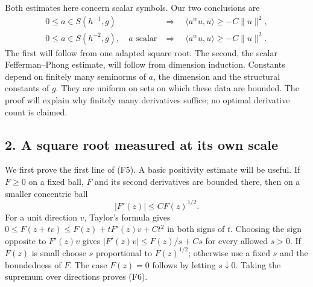 \documentclass[
  11pt,
]{article}
\makeatletter
\let\ReaderOriginalAnchorStart\hyper@anchorstart
\let\ReaderOriginalAnchorEnd\hyper@anchorend
\let\ReaderPendingAliases\@empty
\def\ReaderArmAliases#1{\gdef\ReaderPendingAliases{#1}}
\def\hyper@anchorstart#1{\ReaderIfNativeAnchorTF{#1}{\ReaderPendingAliases\global\let\ReaderPendingAliases\@empty}{}\ReaderOriginalAnchorStart{#1}}
\makeatother
\begin{document}
Both estimates here concern scalar symbols. Our two conclusions are \[
\begin{array}{ll}
0\leq a\in S(h^{-1},g)&\Longrightarrow\quad
 \langle a^wu,u\rangle\geq-C\|u\|^2,\\
0\leq a\in S(h^{-2},g),\quad a\text{ scalar}
 &\Longrightarrow\quad\langle a^wu,u\rangle\geq-C\|u\|^2.
\end{array}
\tag{F5}
\] The first will follow from one adapted square root. The second, the
scalar Fefferman--Phong estimate, will follow from dimension induction.
Constants depend on finitely many seminorms of \(a\), the dimension and
the structural constants of \(g\). They are uniform on sets on which
these data are bounded. The proof will explain why finitely many
derivatives suffice; no optimal derivative count is claimed.

\ReaderArmAliases{\ReaderOriginalAnchorStart{AN03-SFP-002}\ReaderOriginalAnchorEnd\begingroup\expandafter\def\csname @currentHref\endcsname{AN03-SFP-002}\label{AN03-SFP-002}\endgroup\ReaderOriginalAnchorStart{an03-sfp-002-a-square-root-measured-at-its-own-scale}\ReaderOriginalAnchorEnd\begingroup\expandafter\def\csname @currentHref\endcsname{an03-sfp-002-a-square-root-measured-at-its-own-scale}\label{an03-sfp-002-a-square-root-measured-at-its-own-scale}\endgroup\ReaderOriginalAnchorStart{2-a-square-root-measured-at-its-own-scale}\ReaderOriginalAnchorEnd\begingroup\expandafter\def\csname @currentHref\endcsname{2-a-square-root-measured-at-its-own-scale}\label{2-a-square-root-measured-at-its-own-scale}\endgroup\ReaderOriginalAnchorStart{a-square-root-measured-at-its-own-scale}\ReaderOriginalAnchorEnd}
\subsection{2. A square root measured at its own
scale}\label{a-square-root-measured-at-its-own-scale}

We first prove the first line of (F5). A basic positivity estimate will
be useful. If \(F\geq0\) on a fixed ball, \(F\) and its second
derivatives are bounded there, then on a smaller concentric ball \[
|F'(z)|\leq C F(z)^{1/2}.
\tag{F6}
\] For a unit direction \(v\), Taylor's formula gives
\(0\leq F(z+tv)\leq F(z)+tF'(z)v+Ct^2\) in both signs of \(t\). Choosing
the sign opposite to \(F'(z)v\) gives \(|F'(z)v|\leq F(z)/s+Cs\) for
every allowed \(s>0\). If \(F(z)\) is small choose \(s\) proportional to
\(F(z)^{1/2}\); otherwise use a fixed \(s\) and the boundedness of
\(F\). The case \(F(z)=0\) follows by letting \(s\downarrow0\). Taking
the supremum over directions proves (F6).
\end{document}
